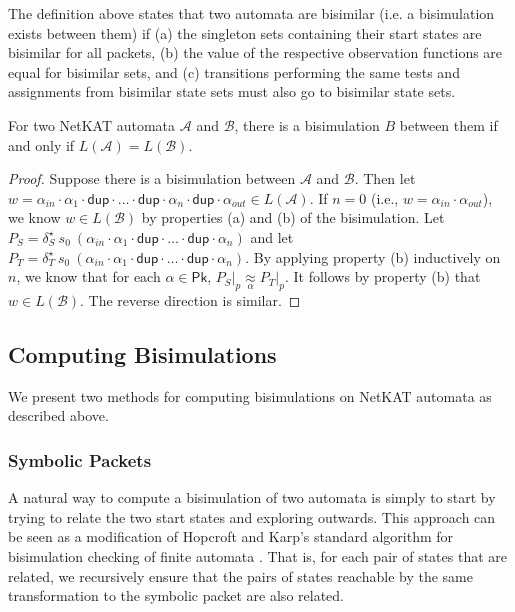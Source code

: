 \documentclass[acmsmall,dvipsnames,nonacm]{acmart}
\newcommand\Pk{\mathsf{Pk}}
\newcommand\pk{\alpha}
\newcommand\dup{\mathsf{dup}}
\newcommand\ddd{\cdot\dup\cdot}
\newcommand\NetKAT{\textsf{NetKAT}\xspace}
\newcommand{\approxp}[1]{\underset{#1}\approx}
\begin{document}
The definition above states that two automata are bisimilar (i.e. a bisimulation
exists between them) if (a) the singleton sets containing their start states are
bisimilar for all packets, (b) the value of the respective observation functions
are equal for bisimilar sets, and (c) transitions performing the same tests
and assignments from bisimilar state sets must also go to bisimilar state sets.

\begin{theorem}
    For two \NetKAT automata $\mathcal{A}$ and $\mathcal{B}$, there is a
    bisimulation $B$ between them if and only if $L(\mathcal{A}) = L(\mathcal{B}).$
\end{theorem}
\begin{proof}
    Suppose there is a bisimulation between $\mathcal{A}$ and $\mathcal{B}$.
    Then let $w = \pk_{in}\cdot \pk_1 \ddd \ldots \ddd \pk_n \ddd \pk_{out} \in
    L(\mathcal{A})$. If $n = 0$ (i.e., $w = \pk_{in} \cdot \pk_{out}$), we know
    $w\in L(\mathcal{B})$ by properties (a) and (b) of the bisimulation.     
    Let $P_S = \delta_S^\star\ s_0\ (\pk_{in} \cdot \pk_1 \ddd \ldots \ddd \pk_n)$ and let
        $P_T = \delta_T^\star\ s_0\ (\pk_{in} \cdot \pk_1 \ddd \ldots \ddd \pk_n)$.
    By applying property (b) inductively on $n$, we know that for each $\pk \in
    \Pk$, $P_S\vert_p \approxp{\pk} P_T\vert_p$. It follows by
    property (b) that $w\in L(\mathcal{B})$. The reverse direction is similar.
\end{proof}

\subsection{Computing Bisimulations}\label{sec:computing-bisim}

We present two methods for computing bisimulations on \NetKAT automata as
described above.

\subsubsection{Symbolic Packets}\label{sec:sp}
A natural way to compute a bisimulation of two automata is simply to start by
trying to relate the two start states and exploring outwards. This approach
can be seen as a modification of Hopcroft and Karp's standard algorithm for bisimulation
checking of finite automata \cite{hopcroft-karp1971}. That is, for each
pair of states that are related, we recursively ensure that the pairs of states
reachable by the same transformation to the symbolic packet are also related.
\end{document}
